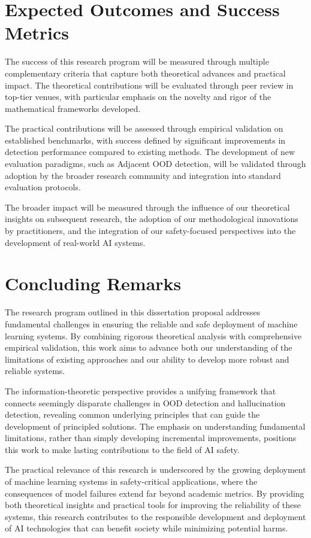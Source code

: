 \documentclass[11pt, oneside]{book}
\theoremstyle{plain}
\theoremstyle{definition}
\theoremstyle{remark}
\begin{document}
\section{Expected Outcomes and Success Metrics}

The success of this research program will be measured through multiple complementary criteria that capture both theoretical advances and practical impact. The theoretical contributions will be evaluated through peer review in top-tier venues, with particular emphasis on the novelty and rigor of the mathematical frameworks developed.

The practical contributions will be assessed through empirical validation on established benchmarks, with success defined by significant improvements in detection performance compared to existing methods. The development of new evaluation paradigms, such as Adjacent OOD detection, will be validated through adoption by the broader research community and integration into standard evaluation protocols.

The broader impact will be measured through the influence of our theoretical insights on subsequent research, the adoption of our methodological innovations by practitioners, and the integration of our safety-focused perspectives into the development of real-world AI systems.

\section{Concluding Remarks}

The research program outlined in this dissertation proposal addresses fundamental challenges in ensuring the reliable and safe deployment of machine learning systems. By combining rigorous theoretical analysis with comprehensive empirical validation, this work aims to advance both our understanding of the limitations of existing approaches and our ability to develop more robust and reliable systems.

The information-theoretic perspective provides a unifying framework that connects seemingly disparate challenges in OOD detection and hallucination detection, revealing common underlying principles that can guide the development of principled solutions. The emphasis on understanding fundamental limitations, rather than simply developing incremental improvements, positions this work to make lasting contributions to the field of AI safety.

The practical relevance of this research is underscored by the growing deployment of machine learning systems in safety-critical applications, where the consequences of model failures extend far beyond academic metrics. By providing both theoretical insights and practical tools for improving the reliability of these systems, this research contributes to the responsible development and deployment of AI technologies that can benefit society while minimizing potential harms.
\end{document}
